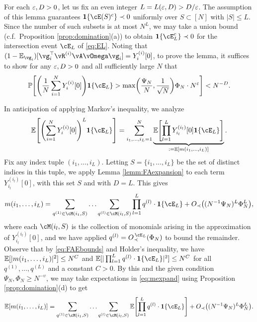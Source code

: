 \begin{proof-of-lemma}[\ref{lemma:fluctuationavg}]
For each $\varepsilon,D>0$, let us fix an even integer $L=L(\varepsilon,D)>D/\varepsilon$.
The assumption of this lemma guarantees
$\bI\{\cE(S)^c\} \prec 0$ uniformly over $S \subset [N]$ with $|S|
\leq L$. Since the number of such subsets is at most $N^L$, we may take a union
bound (c.f.\ Proposition \ref{prop:domination}(a))
to obtain $\bI\{\cE_L^c\} \prec 0$ for the intersection event
$\cE_L$ of \eqref{eq:EL}. Noting that
$(1-\E_{\vg_i})[\vg_i^\top \vR^{(i)}\vA\vOmega\vg_i]=Y_i^{(i)}[0]$,
to prove the lemma, it suffices to show for any $\varepsilon,D>0$ and
all sufficiently large $N$ that
\begin{equation}\label{eq:FAgoal}
\P\left[\left(\frac{1}{N}\sum_{i=1}^N 
Y_i^{(i)}[0]\right)
\bI\{\cE_L\}>\max\left(\frac{\Psi_N}{N},\frac{1}{\sqrt{N}}\right)\Phi_N
\cdot N^\eps \right]<N^{-D}.
\end{equation}

In anticipation of applying Markov's inequality, we analyze
\begin{equation}\label{eq:EYQL}
\E\left[\left(\sum_{i=1}^{N} Y_i^{(i)}[0]\right)^L
\bI\{\cE_L\}\right]
=\sum_{i_1,\ldots,i_L=1}^{N} \underbrace{\E\left[\prod_{l=1}^L Y_{i_l}^{(i_l)}
[0] \bI\{\cE_L\}\right]}_{:=\E[m(i_1,\ldots,i_L)]}.
\end{equation}
Fix any index tuple $(i_1,\ldots,i_L)$.
Letting $S=\{i_1,\ldots,i_L\}$ be the set of distinct indices in this tuple,
we apply Lemma \ref{lemm:FAexpansion} to each term
$Y_{i_l}^{(i_l)}[0]$, with this set $S$ and with $D=L$. This gives
\begin{equation}\label{eq:mexpand}
m(i_1,\ldots,i_L)=\sum_{q^{(1)} \in \cM(i_1,S)} \ldots
\sum_{q^{(l)} \in \cM(i_l,S)} \prod_{l=1}^L q^{(l)} \cdot \bI\{\cE_L\}
+\SD{(N^{-1}\Psi_N)^L\Phi_N^L},
\end{equation}
where each $\cM(i_l,S)$ is the collection of monomials arising in the
approximation of $Y_{i_l}^{(i_l)}[0]$,
and we have applied $q^{(l)}=\SDcEL{\Phi_N}$ to bound the remainder.
Observe that by \eqref{eq:FAEbounds} and Holder's inequality, we have
$\mathbb{E}[|m(i_1,\ldots,i_L)|^2] \leq N^C$ and
$\E[|\prod_{l=1}^L q^{(l)} \cdot \bI\{\cE_L\}|^2] \leq N^C$
for all $q^{(1)},\ldots,q^{(L)}$ and a constant $C>0$.
By this and the given condition $\Psi_N,\Phi_N \geq N^{-\upsilon}$,
we may take expectations in \eqref{eq:mexpand} using
Proposition \ref{prop:domination}(d) to get
\begin{equation}\label{eq:miLbound}
\E[m(i_1,\ldots,i_L)]=\sum_{q^{(1)} \in \cM(i_1,S)} \ldots
\sum_{q^{(l)} \in \cM(i_l,S)} \E\left[\prod_{l=1}^L q^{(l)} \cdot
\bI\{\cE_L\}\right]+\SD{(N^{-1}\Psi_N)^L\Phi_N^L}.
\end{equation}


\end{proof-of-lemma}
